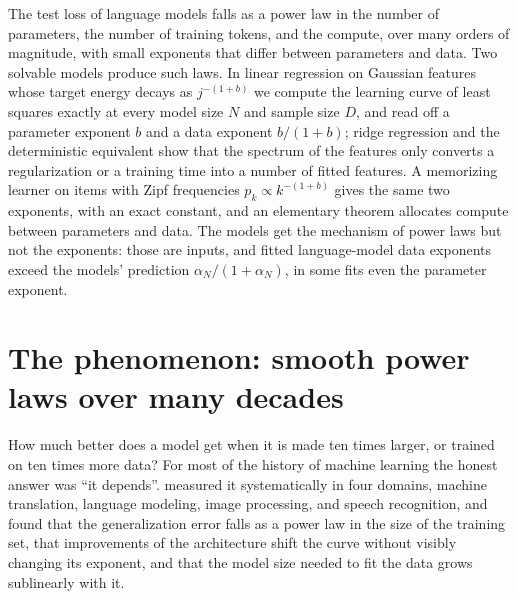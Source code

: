\begin{refsection}

\begin{chaptersummary}
The test loss of language models falls as a power law in the number of parameters, the number of training tokens, and the compute, over many orders of magnitude, with small exponents that differ between parameters and data. Two solvable models produce such laws. In linear regression on Gaussian features whose target energy decays as $j^{-(1+b)}$ we compute the learning curve of least squares exactly at every model size $N$ and sample size $D$, and read off a parameter exponent $b$ and a data exponent $b/(1+b)$; ridge regression and the deterministic equivalent show that the spectrum of the features only converts a regularization or a training time into a number of fitted features. A memorizing learner on items with Zipf frequencies $p_k\propto k^{-(1+b)}$ gives the same two exponents, with an exact constant, and an elementary theorem allocates compute between parameters and data. The models get the mechanism of power laws but not the exponents: those are inputs, and fitted language-model data exponents exceed the models' prediction $\alpha_N/(1+\alpha_N)$, in some fits even the parameter exponent.
\end{chaptersummary}

\section{The phenomenon: smooth power laws over many decades}\label{sec:scaling:phenomenon}

How much better does a model get when it is made ten times larger, or trained on ten times more data? For most of the history of machine learning the honest answer was ``it depends''. \Textcite{HestnessEtAl2017} measured it systematically in four domains, machine translation, language modeling, image processing, and speech recognition, and found that the generalization error falls as a power law in the size of the training set, that improvements of the architecture shift the curve without visibly changing its exponent, and that the model size needed to fit the data grows sublinearly with it.


\end{refsection}
